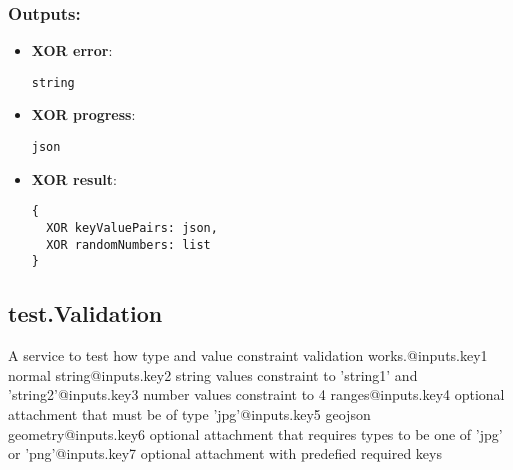\subsubsection*{Outputs:}
\begin{itemize}
  \small
    \item \textbf{XOR error}: 
\begin{lstlisting}
string
\end{lstlisting}
    \item \textbf{XOR progress}: 
\begin{lstlisting}
json
\end{lstlisting}
    \item \textbf{XOR result}: 
\begin{lstlisting}
{
  XOR keyValuePairs: json, 
  XOR randomNumbers: list
}
\end{lstlisting}
  \end{itemize}

\subsection{test.Validation}
\label{ch:builtinservices:test.Validation}
A
 service to test how type and value constraint validation 
works.@inputs.key1 normal string@inputs.key2 string values constraint to
 'string1' and 'string2'@inputs.key3 number values constraint to 4 
ranges@inputs.key4 optional attachment that must be of type 
'jpg'@inputs.key5 geojson geometry@inputs.key6 optional attachment that 
requires types to be one of 'jpg' or 'png'@inputs.key7 optional 
attachment with predefied required keys
